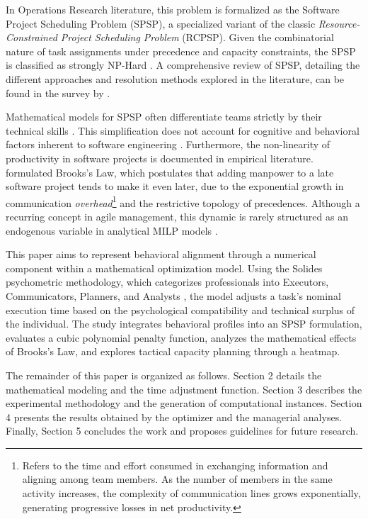 \documentclass[a4paper,11pt]{article}
\begin{document}
In Operations Research literature, this problem is formalized as the Software 
Project Scheduling Problem (SPSP), a specialized variant of the classic 
\textit{Resource-Constrained Project Scheduling Problem} (RCPSP). Given the 
combinatorial nature of task assignments under precedence and capacity 
constraints, the SPSP is classified as strongly NP-Hard \citep{blazewicz1983, kolisch1999}. 
A comprehensive review of SPSP, detailing the different approaches and resolution 
methods explored in the literature, can be found in the survey by \citet{vegavelazquez2018}.

Mathematical models for SPSP often differentiate teams strictly by their 
technical skills \citep{alba2007, chicano2011, pritsker1969}. This simplification 
does not account for cognitive and behavioral factors inherent to software 
engineering \citep{demarco1987}. Furthermore, the non-linearity of productivity 
in software projects is documented in empirical literature. \citet{brooks1975} 
formulated Brooks's Law, which postulates that adding manpower to a late 
software project tends to make it even later, due to the exponential growth 
in communication \textit{overhead}\footnote{Refers to the time and effort 
consumed in exchanging information and aligning among team members. As the 
number of members in the same activity increases, the complexity of communication 
lines grows exponentially, generating progressive losses in net productivity.} 
and the restrictive topology of precedences. Although a recurring concept in 
agile management, this dynamic is rarely structured as an endogenous variable 
in analytical MILP models \citep{ryan2013, acuna2006}.

This paper aims to represent behavioral alignment through a numerical component 
within a mathematical optimization model. Using the Solides psychometric 
methodology, which categorizes professionals into Executors, Communicators, 
Planners, and Analysts \citep{costa2018}, the model adjusts a task's nominal 
execution time based on the psychological compatibility and technical surplus 
of the individual. The study integrates behavioral profiles into an SPSP 
formulation, evaluates a cubic polynomial penalty function, analyzes the 
mathematical effects of Brooks's Law, and explores tactical capacity planning 
through a heatmap.

The remainder of this paper is organized as follows. Section 2 details the 
mathematical modeling and the time adjustment function. Section 3 describes 
the experimental methodology and the generation of computational instances. 
Section 4 presents the results obtained by the optimizer and the managerial 
analyses. Finally, Section 5 concludes the work and proposes guidelines for 
future research.
\end{document}
